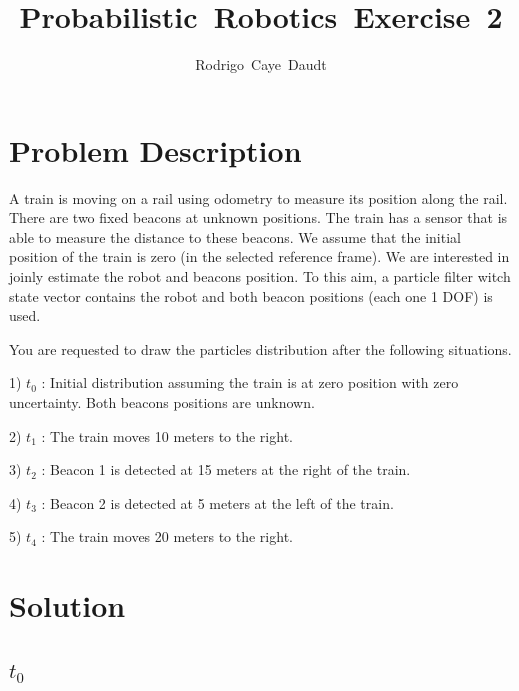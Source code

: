 \documentclass{article}
\begin{document}
\title{Probabilistic~Robotics~Exercise~2}
%

\author{Rodrigo~Caye~Daudt}





\maketitle



\section{Problem Description}

A train is moving on a rail using odometry to measure its position along the rail. There are two fixed beacons at unknown positions. The train has a sensor that is able to measure the distance to these beacons. We assume that the initial position of the train is zero (in the selected reference frame). We are interested in joinly estimate the robot and beacons position. To this aim, a particle filter witch state vector contains the robot and both beacon positions (each one 1 DOF) is used. 

You are requested to draw the particles distribution after the following situations.

1) $t_0$ : Initial distribution assuming the train is at zero position with zero  uncertainty. Both beacons positions are unknown.

2) $t_1$ : The train moves 10 meters to the right.

3) $t_2$ : Beacon 1 is detected at 15 meters at the right of the train.

4) $t_3$ : Beacon 2 is detected at 5 meters at the left of the train.

5) $t_4$ : The train moves 20 meters to the right.


\section{Solution}

\subsection{$t_0$}
\end{document}
